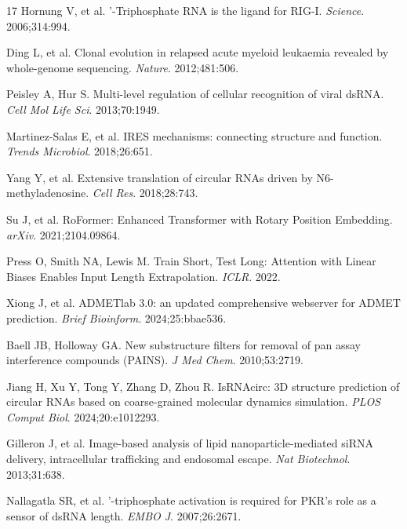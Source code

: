 \documentclass[11pt,a4paper]{article}
\begin{document}
\begin{thebibliography}{17}
Hornung V, et al.
'-Triphosphate RNA is the ligand for RIG-I.
\newblock \emph{Science}. 2006;314:994.

Ding L, et al.
\newblock Clonal evolution in relapsed acute myeloid leukaemia revealed by whole-genome sequencing.
\newblock \emph{Nature}. 2012;481:506.

Peisley A, Hur S.
\newblock Multi-level regulation of cellular recognition of viral dsRNA.
\newblock \emph{Cell Mol Life Sci}. 2013;70:1949.

Martinez-Salas E, et al.
\newblock IRES mechanisms: connecting structure and function.
\newblock \emph{Trends Microbiol}. 2018;26:651.

Yang Y, et al.
\newblock Extensive translation of circular RNAs driven by N6-methyladenosine.
\newblock \emph{Cell Res}. 2018;28:743.

Su J, et al.
\newblock RoFormer: Enhanced Transformer with Rotary Position Embedding.
\newblock \emph{arXiv}. 2021;2104.09864.

Press O, Smith NA, Lewis M.
\newblock Train Short, Test Long: Attention with Linear Biases Enables Input Length Extrapolation.
\newblock \emph{ICLR}. 2022.

Xiong J, et al.
\newblock ADMETlab 3.0: an updated comprehensive webserver for ADMET prediction.
\newblock \emph{Brief Bioinform}. 2024;25:bbae536.

Baell JB, Holloway GA.
\newblock New substructure filters for removal of pan assay interference compounds (PAINS).
\newblock \emph{J Med Chem}. 2010;53:2719.

Jiang H, Xu Y, Tong Y, Zhang D, Zhou R.
\newblock IsRNAcirc: 3D structure prediction of circular RNAs based on coarse-grained molecular dynamics simulation.
\newblock \emph{PLOS Comput Biol}. 2024;20:e1012293.

Gilleron J, et al.
\newblock Image-based analysis of lipid nanoparticle-mediated siRNA delivery, intracellular trafficking and endosomal escape.
\newblock \emph{Nat Biotechnol}. 2013;31:638.

Nallagatla SR, et al.
'-triphosphate activation is required for PKR's role as a sensor of dsRNA length.
\newblock \emph{EMBO J}. 2007;26:2671.

\end{thebibliography}
\end{document}
